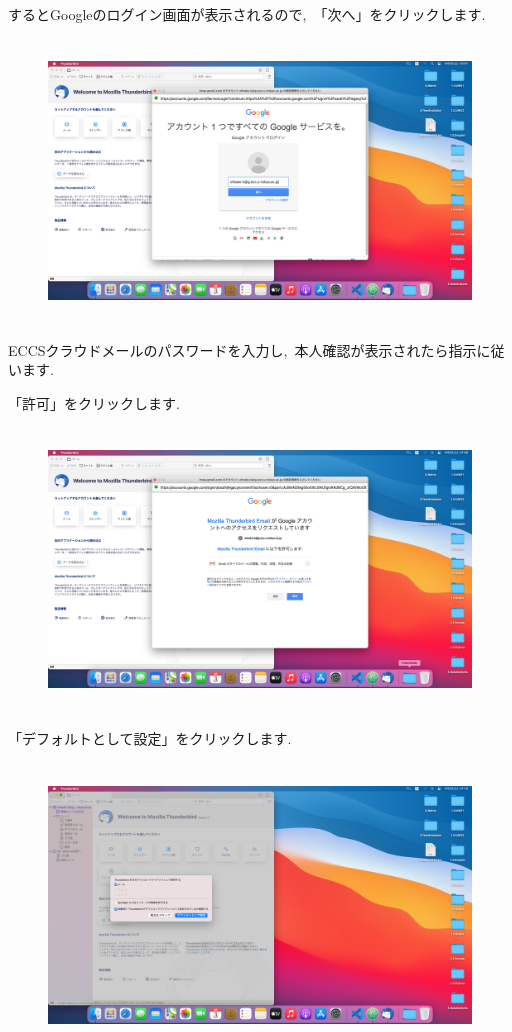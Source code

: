 \documentclass{jarticle}
\begin{document}
するとGoogleのログイン画面が表示されるので,\ 「次へ」をクリックします.\ 
\begin{figure}[H]
  \centering
  \includegraphics[height=7.5cm]{fig/MacThunderbird3.png}
\end{figure}

ECCSクラウドメールのパスワードを入力し,\ 本人確認が表示されたら指示に従います.\ 

\newpage
「許可」をクリックします.\ 
\begin{figure}[H]
  \centering
  \includegraphics[height=7.5cm]{fig/MacThunderbird4.png}
\end{figure}

「デフォルトとして設定」をクリックします.\ 
\begin{figure}[H]
  \centering
  \includegraphics[height=7.5cm]{fig/MacThunderbird5.png}
\end{figure}
\end{document}
